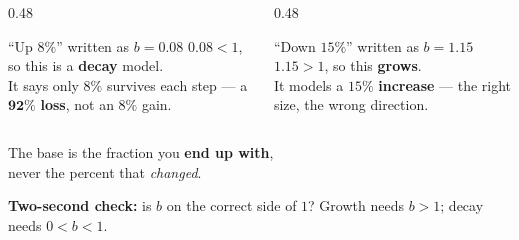 \documentclass[aspectratio=169, 11pt]{beamer}
\begin{document}
\begin{frame}[t, plain]
  \begin{columns}[T]
    \begin{column}{0.48\textwidth}
      \begin{block}{``Up $8\%$'' written as $b=0.08$}
        $0.08 < 1$, so this is a \textbf{decay} model. \\[3pt]
        It says only $8\%$ survives each step --- a $\mathbf{92\%}$ \textbf{loss}, not an $8\%$ gain.
      \end{block}
    \end{column}
    \begin{column}{0.48\textwidth}
      \begin{block}{``Down $15\%$'' written as $b=1.15$}
        $1.15 > 1$, so this \textbf{grows}. \\[3pt]
        It models a $15\%$ \textbf{increase} --- the right size, the wrong direction.
      \end{block}
    \end{column}
  \end{columns}
  \vspace{10pt}
  \begin{center}
    \Large The base is the fraction you \textbf{end up with}, \\[3pt]
    never the percent that \emph{changed}.
  \end{center}
  \vspace{6pt}
  \begin{center}
    {\footnotesize \textbf{Two-second check:} is $b$ on the correct side of $1$?
    Growth needs $b>1$; decay needs $0<b<1$.}
  \end{center}
\end{frame}
\end{document}
